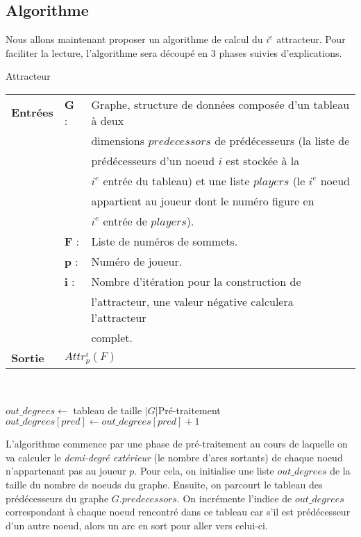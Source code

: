 \documentclass[12pt,a4paper,oneside,titlepage]{report}
\begin{document}
\subsection{Algorithme}
Nous allons maintenant proposer un algorithme de calcul du $i^e$ attracteur. Pour faciliter la lecture, l'algorithme sera découpé en 3 phases suivies d'explications.
\begin{algorithm}[H]
\caption{Attracteur}\label{attractor}
\hspace*{\algorithmicindent} 
\begin{tabular}{lll}
	\textbf{Entrées} & \textbf{G} : &Graphe, structure de données composée d'un tableau à deux\\
	&&dimensions $predecessors$ de prédécesseurs (la liste de \\
	&&prédécesseurs d'un noeud $i$ est stockée à la \\
	&&$i^e$ entrée du tableau) et une liste $players$ (le $i^e$ noeud\\
	&&appartient au joueur dont le numéro figure en \\
	&&$i^e$ entrée de $players$).\\
	&\textbf{F} : &Liste de numéros de sommets.\\
	&\textbf{p} : &Numéro de joueur.\\
	&\textbf{i} : &Nombre d'itération pour la construction de\\
	&&l'attracteur, une valeur négative calculera l'attracteur\\
	&&complet.\\
	\textbf{Sortie} &\multicolumn{2}{l}{$Attr_p^i(F)$}\\
\end{tabular}\\
\begin{algorithmic}[1]
	\State $out\_degrees \gets$ tableau de taille $|G|$\Comment Pré-traitement
				\State $out\_degrees[pred] \gets out\_degrees[pred]+1$
			\EndFor
		\EndIf
	\EndFor
{}
\end{algorithmic}
\end{algorithm}
L'algorithme commence par une phase de pré-traitement au cours de laquelle on va calculer le \emph{demi-degré extérieur} (le nombre d'arcs sortants) de chaque noeud n'appartenant pas au joueur $p$. Pour cela, on initialise une liste $out\_degrees$ de la taille du nombre de noeuds du graphe. Ensuite, on parcourt le tableau des prédécesseurs du graphe $G.predecessors$. On incrémente l'indice de $out\_degrees$ correspondant à chaque noeud rencontré dans ce tableau car s'il est prédécesseur d'un autre noeud, alors un arc en sort pour aller vers celui-ci.
\end{document}
